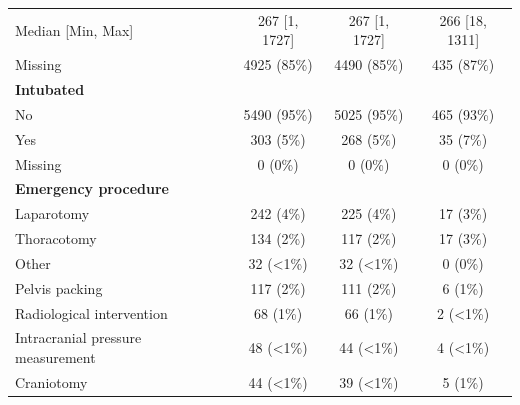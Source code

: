 \documentclass[12pt, a4paper]{article}
\begin{document}
\begin{appendices}
\begin{table}[t!]
{\begin{tabular}{lccc}
				\hspace{3mm}Median [Min, Max]                 & 267 [1, 1727]     & 267 [1, 1727]     & 266 [18, 1311]   \\
				\hspace{3mm}Missing                           & 4925 (85\%)       & 4490 (85\%)       & 435 (87\%)       \\
				\textbf{Intubated}                            &                   &                   &                  \\
				\hspace{3mm}No                                & 5490 (95\%)       & 5025 (95\%)       & 465 (93\%)       \\
				\hspace{3mm}Yes                               & 303 (5\%)         & 268 (5\%)         & 35 (7\%)         \\
				\hspace{3mm}Missing                           & 0 (0\%)           & 0 (0\%)           & 0 (0\%)          \\
				\textbf{Emergency procedure}                  &                   &                   &                  \\
				\hspace{3mm}Laparotomy                        & 242 (4\%)         & 225 (4\%)         & 17 (3\%)         \\
				\hspace{3mm}Thoracotomy                       & 134 (2\%)         & 117 (2\%)         & 17 (3\%)         \\
				\hspace{3mm}Other                             & 32 (\textless1\%) & 32 (\textless1\%) & 0 (0\%)          \\
				\hspace{3mm}Pelvis packing                    & 117 (2\%)         & 111 (2\%)         & 6 (1\%)          \\
				\hspace{3mm}Radiological intervention         & 68 (1\%)          & 66 (1\%)          & 2 (\textless1\%) \\
				\hspace{3mm}Intracranial pressure measurement & 48 (\textless1\%) & 44 (\textless1\%) & 4 (\textless1\%) \\
				\hspace{3mm}Craniotomy                        & 44 (\textless1\%) & 39 (\textless1\%) & 5 (1\%)          \\

\end{tabular}}
\end{table}
\end{appendices}
\end{document}
